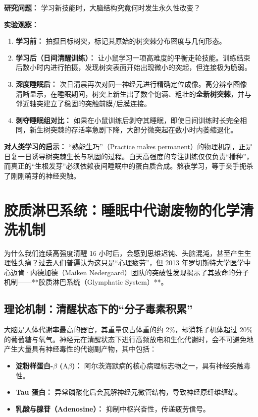 \documentclass[12pt,a4paper,openany]{ctexbook}
\begin{document}
\begin{casebox}[活体神经元树突棘生长监测研究]
\textbf{研究问题：} 学习新技能时，大脑结构究竟何时发生永久性改变？

\textbf{实验观察：}
\begin{enumerate}
    \item \textbf{学习前：} 拍摄目标树突，标记其原始的树突棘分布密度与几何形态。
    \item \textbf{学习后（日间清醒训练）：} 让小鼠学习一项高难度的平衡走轮技能。训练结束后数小时内进行拍摄，发现树突表面开始出现微小的突起，但连接极为脆弱。
    \item \textbf{深度睡眠后：} 次日清晨再次对同一神经元进行精确定位成像。高分辨率图像清晰显示，在睡眠期间，树突上新生出了数个饱满、粗壮的\textbf{全新树突棘}，并与邻近轴突建立了稳固的突触前膜/后膜连接。
    \item \textbf{剥夺睡眠组对比：} 如果在小鼠训练后剥夺其睡眠，即使日间训练时长完全相同，新生树突棘的存活率急剧下降，大部分微突起在数小时内萎缩退化。
\end{enumerate}

\textbf{对人类学习的启示：}
“熟能生巧”（Practice makes permanent）的物理机制，正是日复一日诱导树突棘生长与巩固的过程。白天高强度的专注训练仅仅负责“播种”，而真正的“生根发芽”必须依赖夜间睡眠中的蛋白质合成。熬夜学习，等于亲手扼杀了刚刚萌芽的神经突触。
\end{casebox}

\section{胶质淋巴系统：睡眠中代谢废物的化学清洗机制}

为什么我们连续高强度清醒 16 小时后，会感到思维迟钝、头脑混沌，甚至产生生理性头痛？过去人们普遍认为这只是“心理疲劳”，但 2013 年罗切斯特大学医学中心迈肯·内德加德（Maiken Nedergaard）团队的突破性发现揭示了其致命的分子机制——**胶质淋巴系统（Glymphatic System）**。

\subsection*{理论机制：清醒状态下的“分子毒素积累”}

大脑是人体代谢率最高的器官，其重量仅占体重的约 2\%，却消耗了机体超过 20\% 的葡萄糖与氧气。神经元在清醒状态下进行高频放电和生化代谢时，会不可避免地产生大量具有神经毒性的代谢副产物，其中包括：
\begin{itemize}
    \item \textbf{淀粉样蛋白-$\beta$ ($\text{A}\beta$)：} 阿尔茨海默病的核心病理标志物之一，具有神经突触毒性。
    \item \textbf{Tau 蛋白：} 异常磷酸化后会瓦解神经元微管结构，导致神经原纤维缠结。
    \item \textbf{乳酸与腺苷（Adenosine）：} 抑制中枢兴奋性，传递疲劳信号。
\end{itemize}
\end{document}
